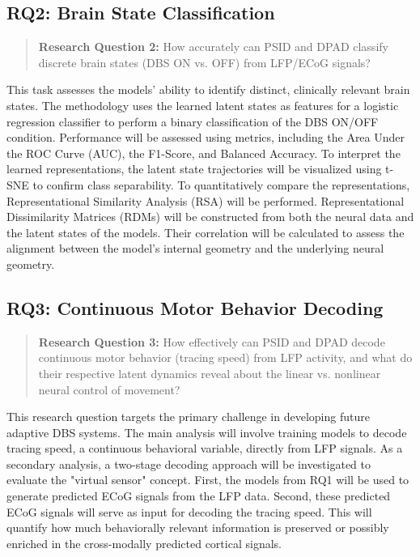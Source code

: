 \documentclass[12pt, a4paper]{article}
\begin{document}
\subsection{RQ2: Brain State Classification}

\begin{quote}

    \textbf{Research Question 2:} How accurately can PSID and DPAD classify discrete brain states (DBS ON vs. OFF) from LFP/ECoG signals?

\end{quote}

This task assesses the models' ability to identify distinct, clinically relevant brain states. The methodology uses the learned latent states as features for a logistic regression classifier to perform a binary classification of the DBS ON/OFF condition. Performance will be assessed using metrics, including the Area Under the ROC Curve (AUC), the F1-Score, and Balanced Accuracy. To interpret the learned representations, the latent state trajectories will be visualized using t-SNE to confirm class separability. To quantitatively compare the representations, Representational Similarity Analysis (RSA) will be performed. Representational Dissimilarity Matrices (RDMs) will be constructed from both the neural data and the latent states of the models. Their correlation will be calculated to assess the alignment between the model's internal geometry and the underlying neural geometry.


\subsection{RQ3: Continuous Motor Behavior Decoding}
\begin{quote}
    \textbf{Research Question 3:} How effectively can PSID and DPAD decode continuous motor behavior (tracing speed) from LFP activity, and what do their respective latent dynamics reveal about the linear vs. nonlinear neural control of movement?
\end{quote}

This research question targets the primary challenge in developing future adaptive DBS systems. The main analysis will involve training models to decode tracing speed, a continuous behavioral variable, directly from LFP signals. As a secondary analysis, a two-stage decoding approach will be investigated to evaluate the "virtual sensor" concept. First, the models from RQ1 will be used to generate predicted ECoG signals from the LFP data. Second, these predicted ECoG signals will serve as input for decoding the tracing speed. This will quantify how much behaviorally relevant information is preserved or possibly enriched in the cross-modally predicted cortical signals.
\end{document}
